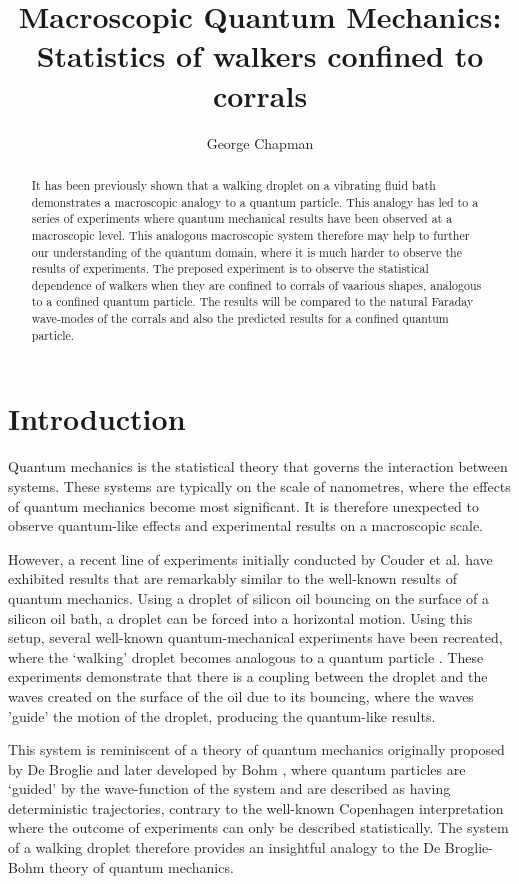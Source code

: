 \documentclass[11pt]{article}
\author{George Chapman}
\title{Macroscopic Quantum Mechanics: Statistics of walkers confined to corrals}
\begin{document}
\maketitle

\begin{abstract}
It has been previously shown that a walking droplet on a vibrating fluid bath demonstrates a macroscopic analogy to a quantum particle.  This analogy has led to a series of experiments where quantum mechanical results have been observed at a macroscopic level.  This analogous macroscopic system therefore may help to further our understanding of the quantum domain, where it is much harder to observe the results of experiments.  The preposed experiment is to observe the statistical dependence of walkers when they are confined to corrals of vaarious shapes, analogous to a confined quantum particle.  The results will be compared to the natural Faraday wave-modes of the corrals and also the predicted results for a confined quantum particle.
\end{abstract}

\section{Introduction}
\label{sec:introduction}

Quantum mechanics is the statistical theory that governs the interaction between systems.  These systems are typically on the scale of nanometres, where the effects of quantum mechanics become most significant.  It is therefore unexpected to observe quantum-like effects and experimental results on a macroscopic scale.

However, a recent line of experiments initially conducted by Couder et al.\cite{1} have exhibited results that are remarkably similar to the well-known results of quantum mechanics.  Using a droplet of silicon oil bouncing on the surface of a silicon oil bath, a droplet can be forced into a horizontal motion.  Using this setup, several well-known quantum-mechanical experiments have been recreated, where the `walking' droplet becomes analogous to a quantum particle \cite{1,6,7}.  These experiments demonstrate that there is a coupling between the droplet and the waves created on the surface of the oil due to its bouncing, where the waves 'guide' the motion of the droplet, producing the quantum-like results.

This system is reminiscent of a theory of quantum mechanics originally proposed by De Broglie and later developed by Bohm \cite{17}, where quantum particles are `guided' by the wave-function of the system and are described as having deterministic trajectories, contrary to the well-known Copenhagen interpretation where the outcome of experiments can only be described statistically.  The system of a walking droplet therefore provides an insightful analogy to the De Broglie-Bohm theory of quantum mechanics.
\end{document}
